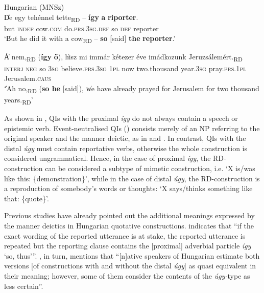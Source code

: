 \documentclass[output=paper,colorlinks,citecolor=brown]{langscibook}
\begin{document}
\ea\label{ex:teptiuk:25} Hungarian (MNSz)\\
\ea\label{ex:teptiuk:25a}
\gll \|De egy tehénnel tette\|\textsubscript{RD} – \textbf{így} \textbf{a} \textbf{riporter}.\\
{\db}but \textsc{indef} cow.\textsc{com} do.\textsc{prs.3sg.def} {} so \textsc{def} reporter\\
\glt ‘\|But he did it with a cow\|\textsubscript{RD} – \textbf{so} [said] \textbf{the} \textbf{reporter}.’

\ex\label{ex:teptiuk:25b}
\gll \|Á nem,\|\textsubscript{RD} (\textbf{így} \textbf{ő}), \|hisz mi immár kétezer éve imádkozunk Jeruzsálemért.\|\textsubscript{RD}\\
{\db}\textsc{interj} \textsc{neg} so 3\textsc{sg} {\db}believe.\textsc{prs.3sg} 1\textsc{pl} now two.thousand year.3\textsc{sg} pray.\textsc{prs.1pl} Jerusalem.\textsc{caus}\\
\glt \|‘Ah no,\|\textsubscript{RD} (\textbf{so he} [said]), \|we have already prayed for Jerusalem for two thousand years.\|\textsubscript{RD}’
\z
\z

As shown in , QIs with the proximal \textit{így} do not always contain a speech or epistemic verb. Event-neutralised QIs () consists merely of an NP referring to the original speaker and the manner deictic, as in  and . In contrast, QIs with the distal \textit{úgy} must contain reportative verbs, otherwise the whole construction is considered ungrammatical. Hence, in the case of proximal \textit{így}, the RD-construction can be considered a subtype of mimetic construction, i.e. ‘X is/was like this: \{demonstration\}’, while in the case of distal \textit{úgy}, the RD-construction is a reproduction of somebody’s words or thoughts: ‘X says/thinks something like that: \{quote\}’.

Previous studies have already pointed out the additional meanings expressed by the manner deictics in Hungarian quotative constructions. \citet[83]{Kiefer2016} indicates that “if the exact wording of the reported utterance is at stake, the reported utterance is repeated but the reporting clause contains the [proximal] adverbial particle \textit{így} ‘so, thus’”. \citet[607]{Körtvély2016}, in turn, mentions that “[n]ative speakers of Hungarian estimate both versions [of constructions with and without the distal \textit{úgy}] as quasi equivalent in their meaning; however, some of them consider the contents of the \textit{úgy-}type as less certain”.
\end{document}
